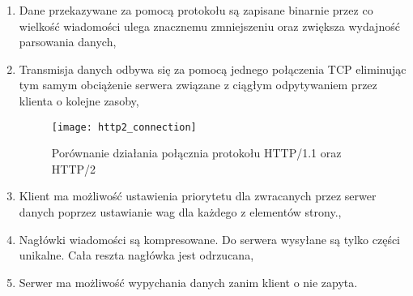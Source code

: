 \begin{enumerate}
    \item Dane przekazywane za pomocą protokołu są zapisane binarnie przez co wielkość wiadomości ulega znacznemu zmniejszeniu oraz zwiększa wydajność parsowania danych, 
    \item Transmisja danych odbywa się za pomocą jednego połączenia TCP eliminując tym samym obciążenie serwera związane z ciągłym odpytywaniem przez klienta o kolejne zasoby\cite{ludin2017learninghmultiplex},
    \begin{figure}[h]
        \caption{Porównanie działania połącznia protokołu HTTP/1.1 oraz HTTP/2}
        \texttt{[image: http2\_connection]}
        \centering
    \end{figure}
    \item Klient ma możliwość ustawienia priorytetu dla zwracanych przez serwer danych poprzez ustawianie wag dla każdego z elementów strony.\cite{ludin2017learninghpriority},
    \item  Nagłówki wiadomości są kompresowane. Do serwera wysyłane są tylko części unikalne. Cała reszta nagłówka jest odrzucana\cite{ludin2017learninghpack},
    \item Serwer ma możliwość wypychania danych zanim klient o nie zapyta\cite{ludin2017learningserverpush}. 
\end{enumerate}  
